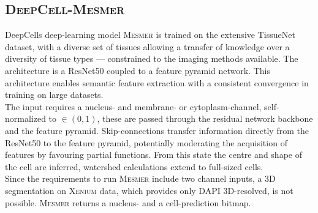 \subsection*{\color{mesmer}\textsc{DeepCell-Mesmer}}
DeepCells deep-learning model \textsc{Mesmer} is trained on the extensive TissueNet dataset, with a diverse set of tissues allowing a transfer of knowledge over a diversity of tissue types --- constrained to the imaging methods available. The architecture is a ResNet50 coupled to a feature pyramid network. This architecture enables semantic feature extraction with a consistent convergence in training on large datasets. \cite{greenwald_whole-cell_2022}\cite{lin_feature_2017}\\
The input requires a nucleus- and membrane- or cytoplasm-channel, self-normalized to $\in (0,1)$, these are passed through the residual network backbone and the feature pyramid. Skip-connections transfer information directly from the ResNet50 to the feature pyramid, potentially moderating the acquisition of features by favouring partial functions. From this state the centre and shape of the cell are inferred, watershed calculations extend to full-sized cells.\\
Since the requirements to run \textsc{Mesmer} include two channel inputs, a 3D segmentation on \textsc{Xenium} data, which provides only DAPI 3D-resolved, is not possible. \textsc{Mesmer} returns a nucleus- and a cell-prediction bitmap.\\
